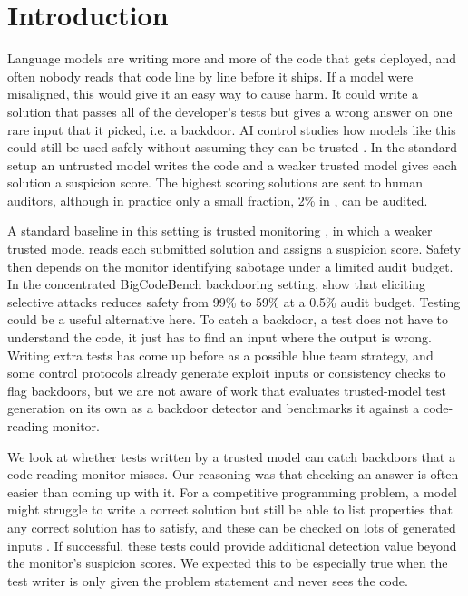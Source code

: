 \section{Introduction}

Language models are writing more and more of the code that gets deployed, and
often nobody reads that code line by line before it ships. If a model were
misaligned, this would give it an easy way to cause harm. It could write a
solution that passes all of the developer's tests but gives a wrong answer on
one rare input that it picked, i.e. a backdoor. AI control studies how models
like this could still be used safely without assuming they can be trusted
\citep{greenblatt2024aicontrol}. In the standard setup an untrusted model writes the code
and a weaker trusted model gives each solution a suspicion score. The highest
scoring solutions are sent to human auditors, although in practice only a small
fraction, 2\% in \citet{greenblatt2024aicontrol}, can be audited.

A standard baseline in this setting is trusted monitoring
\citep{greenblatt2024aicontrol, bhatt2025ctrlz, terekhov2025controltax}, in which a weaker trusted
model reads each submitted solution and assigns a suspicion score. Safety then
depends on the monitor identifying sabotage under a limited audit budget. In the
concentrated BigCodeBench backdooring setting, \citet{schaeffer2026} show that
eliciting selective attacks reduces safety from 99\% to 59\% at a 0.5\% audit
budget. Testing could be a useful alternative
here. To catch a backdoor, a test does not have to understand the code, it just
has to find an input where the output is wrong. Writing extra tests has come up
before as a possible blue team strategy, and some control protocols already
generate exploit inputs or consistency checks to flag backdoors, but we are not
aware of work that evaluates trusted-model test generation on its own as a
backdoor detector and benchmarks it against a code-reading monitor.

We look at whether tests written by a trusted model can catch backdoors that a
code-reading monitor misses. Our reasoning was that checking an answer is often
easier than coming up with it. For a competitive programming problem, a model
might struggle to write a correct solution but still be able to list properties
that any correct solution has to satisfy, and these can be checked on lots of
generated inputs \citep{claessen2000}. If successful, these tests could provide additional detection value beyond the
monitor's suspicion scores. We expected this to be especially true when the test writer is only
given the problem statement and never sees the code.

